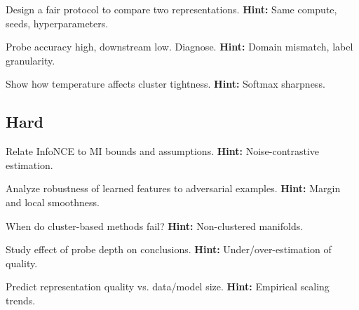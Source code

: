 \begin{problem}
Design a fair protocol to compare two representations.
\textbf{Hint:} Same compute, seeds, hyperparameters.
\end{problem}

\begin{problem}
Probe accuracy high, downstream low. Diagnose.
\textbf{Hint:} Domain mismatch, label granularity.
\end{problem}

\begin{problem}[Geometry]
Show how temperature affects cluster tightness.
\textbf{Hint:} Softmax sharpness.
\end{problem}

\subsection*{Hard}
\begin{problem}
Relate InfoNCE to MI bounds and assumptions.
\textbf{Hint:} Noise-contrastive estimation.
\end{problem}

\begin{problem}
Analyze robustness of learned features to adversarial examples.
\textbf{Hint:} Margin and local smoothness.
\end{problem}

\begin{problem}
When do cluster-based methods fail?
\textbf{Hint:} Non-clustered manifolds.
\end{problem}

\begin{problem}
Study effect of probe depth on conclusions.
\textbf{Hint:} Under/over-estimation of quality.
\end{problem}

\begin{problem}
Predict representation quality vs. data/model size.
\textbf{Hint:} Empirical scaling trends.
\end{problem}


